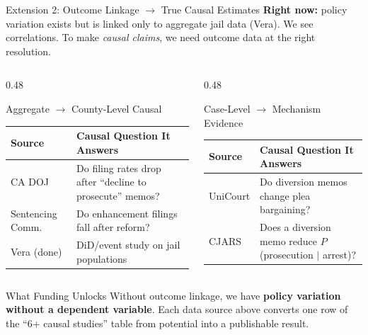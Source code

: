 \documentclass[aspectratio=169, 11pt]{beamer}
\newcommand{\tablefont}{\fontsize{7.5}{9.5}\selectfont}
\begin{document}
\begin{frame}{Extension 2: Outcome Linkage $\to$ True Causal Estimates}
{\small \textbf{Right now:} policy variation exists but is linked only to aggregate jail data (Vera). We see correlations. To make \emph{causal claims}, we need outcome data at the right resolution.}
\vspace{4pt}
\begin{columns}[T]
\begin{column}{0.48\textwidth}
\begin{block}{Aggregate $\to$ County-Level Causal}
{\tablefont
\begin{tabularx}{\columnwidth}{lX}
\toprule
\textbf{Source} & \textbf{Causal Question It Answers} \\
\midrule
CA DOJ & Do filing rates drop after ``decline to prosecute'' memos? \\
Sentencing Comm. & Do enhancement filings fall after reform? \\
Vera (\textcolor{medalistgreen}{done}) & DiD/event study on jail populations \\
\bottomrule
\end{tabularx}}
\end{block}
\end{column}
\begin{column}{0.48\textwidth}
\begin{block}{Case-Level $\to$ Mechanism Evidence}
{\tablefont
\begin{tabularx}{\columnwidth}{lX}
\toprule
\textbf{Source} & \textbf{Causal Question It Answers} \\
\midrule
UniCourt & Do diversion memos change plea bargaining? \\
CJARS & Does a diversion memo reduce $P$(prosecution $|$ arrest)? \\
\bottomrule
\end{tabularx}}
\end{block}
\end{column}
\end{columns}
\vspace{6pt}
\begin{alertblock}{What Funding Unlocks}
Without outcome linkage, we have \textbf{policy variation without a dependent variable}. Each data source above converts one row of the ``6+ causal studies'' table from potential into a publishable result.
\end{alertblock}
\end{frame}
\end{document}
